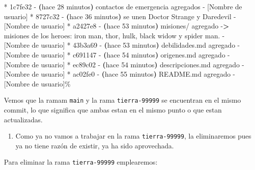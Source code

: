\documentclass[
]{book}
\newenvironment{Shaded}{\begin{snugshade}}{\end{snugshade}}
\newcommand{\AttributeTok}[1]{\textcolor[rgb]{0.13,0.29,0.53}{#1}}
\newcommand{\ErrorTok}[1]{\textcolor[rgb]{0.64,0.00,0.00}{\textbf{#1}}}
\newcommand{\ExtensionTok}[1]{#1}
\newcommand{\KeywordTok}[1]{\textcolor[rgb]{0.13,0.29,0.53}{\textbf{#1}}}
\newcommand{\NormalTok}[1]{#1}
\newcommand{\OperatorTok}[1]{\textcolor[rgb]{0.81,0.36,0.00}{\textbf{#1}}}
\providecommand{\tightlist}{%
  \setlength{\itemsep}{0pt}\setlength{\parskip}{0pt}}
\begin{document}
\begin{Shaded}
\begin{Highlighting}[]
\ExtensionTok{*}\NormalTok{ 1c7fe32 }\AttributeTok{{-}} \ErrorTok{(}\ExtensionTok{hace}\NormalTok{ 28 minutos}\KeywordTok{)} \ExtensionTok{contactos}\NormalTok{ de emergencia agregados }\AttributeTok{{-}}\NormalTok{ [Nombre de usuario]}
\ExtensionTok{*}\NormalTok{ 8727c32 }\AttributeTok{{-}} \ErrorTok{(}\ExtensionTok{hace}\NormalTok{ 36 minutos}\KeywordTok{)} \ExtensionTok{se}\NormalTok{ unen Doctor Strange y Daredevil }\AttributeTok{{-}}\NormalTok{ [Nombre de usuario]}
\ExtensionTok{*}\NormalTok{ a2427e8 }\AttributeTok{{-}} \ErrorTok{(}\ExtensionTok{hace}\NormalTok{ 53 minutos}\KeywordTok{)} \ExtensionTok{misiones/}\NormalTok{ agregado }\AttributeTok{{-}}\OperatorTok{\textgreater{}}\NormalTok{ misiones de los heroes: iron man, thor, hulk, black widow y spider man. }\AttributeTok{{-}}\NormalTok{ [Nombre de usuario]}
\ExtensionTok{*}\NormalTok{ 43b3a69 }\AttributeTok{{-}} \ErrorTok{(}\ExtensionTok{hace}\NormalTok{ 53 minutos}\KeywordTok{)} \ExtensionTok{debilidades.md}\NormalTok{ agregado }\AttributeTok{{-}}\NormalTok{ [Nombre de usuario]}
\ExtensionTok{*}\NormalTok{ c691147 }\AttributeTok{{-}} \ErrorTok{(}\ExtensionTok{hace}\NormalTok{ 54 minutos}\KeywordTok{)} \ExtensionTok{origenes.md}\NormalTok{ agregado }\AttributeTok{{-}}\NormalTok{ [Nombre de usuario]}
\ExtensionTok{*}\NormalTok{ ec89c02 }\AttributeTok{{-}} \ErrorTok{(}\ExtensionTok{hace}\NormalTok{ 54 minutos}\KeywordTok{)} \ExtensionTok{descripciones.md}\NormalTok{ agregado }\AttributeTok{{-}}\NormalTok{ [Nombre de usuario]}
\ExtensionTok{*}\NormalTok{ ac02fe0 }\AttributeTok{{-}} \ErrorTok{(}\ExtensionTok{hace}\NormalTok{ 55 minutos}\KeywordTok{)} \ExtensionTok{README.md}\NormalTok{ agregado }\AttributeTok{{-}}\NormalTok{ [Nombre de usuario]\%   }
\end{Highlighting}
\end{Shaded}

Vemos que la ramam \texttt{main} y la rama \texttt{tierra-99999} se encuentran en el mismo commit, lo que significa que ambas estan en el mismo punto o que estan actualizadas.

\begin{enumerate}
\def\labelenumi{\arabic{enumi}.}
\setcounter{enumi}{10}
\tightlist
\item
  Como ya no vamos a trabajar en la rama \texttt{tierra-99999}, la eliminaremos pues ya no tiene razón de existir, ya ha sido aprovechada.
\end{enumerate}

Para eliminar la rama \texttt{tierra-99999} emplearemos:
\end{document}

